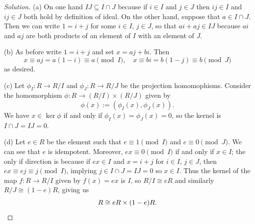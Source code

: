 \documentclass[10pt]{scrartcl}
\newenvironment{soln}{\begin{proof}[Solution]}{\end{proof}}
\begin{document}
\begin{soln}
	(a) On one hand $IJ\subseteq I\cap J$ because if $i\in I$ and $j\in J$
	then $ij\in I$ and $ij\in J$ both hold by definition of ideal.
	On the other hand, suppose that $a\in I\cap J$.
	Then we can write $1 = i + j$ for some $i\in I$, $j\in J$,
	so that $ai + aj\in IJ$ because $ai$ and $aj$ are both
	products of an element of $I$ with an element of $J$.
	
	(b) As before write $1 = i+j$ and set $x = aj + bi$. Then
	\[x\equiv aj = a(1 - i) \equiv a\pmod I,\quad
	x\equiv bi = b(1 - j)\equiv b\pmod J\]
	as desired.
	
	(c) Let $\phi_I\colon R\to R/I$ and $\phi_J\colon R\to R/J$
	be the projection homomophisms.
	Consider the homomorphism $\phi\colon R\to (R/I)\times (R/J)$ given by
	\[\phi(x) := (\phi_I(x), \phi_J(x)).\]
	We have $x\in\ker\phi$ if and only if $\phi_I(x) = \phi_J(x) = 0$,
	so the kernel is $I\cap J = IJ = 0$.
	
	(d) Let $e\in R$ be the element such that $e\equiv 1\pmod I$ and
	$e\equiv 0\pmod J$. We can see that $e$ is idempotent.
	Moreover, $ex \equiv 0\pmod I$ if and only if $x\in I$;
	the only if direction is because if $ex \in I$ and $x = i+j$ for
	$i\in I$, $j\in J$, then $ex\equiv ej\equiv j\pmod I$,
	implying $j\in I\cap J = IJ = 0$ so $x\in I$.
	Thus the kernel of the map $f\colon R\to R/I$ given by $f(x) = ex$
	is $I$, so $R/I\cong eR$ and similarly $R/J\cong (1-e)R$, giving us
	\[R\cong eR\times (1-e)R.\qedhere\]
\end{soln}
\end{document}
